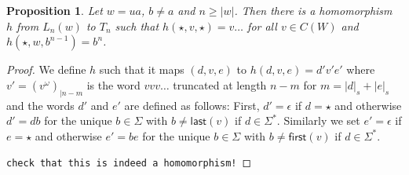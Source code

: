 \documentclass[a4paper]{article}
\newcommand{\size}[1]{{|{#1}|_s}}
\newcommand{\first}[1]{\mathsf{first}({#1})}
\newcommand{\last}[1]{\mathsf{last}({#1})}
\newtheorem{proposition}[theorem]{Proposition}
\begin{document}
\begin{proposition}
 Let $w = u a$, $b \neq a$ and $n \geq |w|$. Then there is a
homomorphism $h$ from $L_n(w)$ to $T_n$ such that $h(\star,v,\star) = v
\dots$ for all $v \in C(W)$ and $h(\star,w,b^{n - 1}) = b^n$.
\end{proposition}
\begin{proof}
 We define $h$ such that it maps $(d,v,e)$ to $h(d,v,e) = d' v' e'$
where $v' = (v^\omega)_{|n - m}$ is the word $v v v\dots$ truncated at
length $n - m$ for $m = \size{d} + \size{e}$ and the words $d'$ and $e'$
are defined as follows: First, $d' = \epsilon$ if $d = \star$ and
otherwise $d' = d b$ for the unique $b \in \Sigma$ with $b \neq
\last{v}$ if $d \in \Sigma^*$. Similarly we set $e' = \epsilon$ if $e =
\star$ and otherwise $e' = b e$ for the unique $b \in \Sigma$ with $b
\neq \first{v}$ if $d \in \Sigma^*$.

\texttt{check that this is indeed a homomorphism!}
\end{proof}
\end{document}
